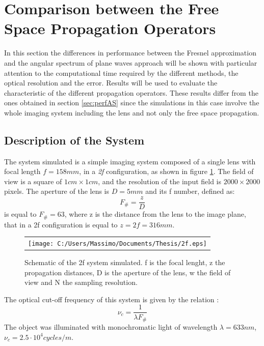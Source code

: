  \section{Comparison between the Free Space Propagation Operators}
 \label{sec:comp}
	 In this section the differences in performance between the Fresnel approximation and the angular spectrum of plane waves approach will be shown with particular attention to the computational time required by the different methods, the optical resolution and the error. Results will be used to evaluate the characteristic of the different propagation operators. These results differ from the ones obtained in section \ref{sec:perfAS} since the simulations in this case involve the whole imaging system including the lens and not only the free space propagation.
	 \subsection{Description of the System}
	 \label{sec:system}
	 The system simulated is a simple imaging system composed of a single lens with focal length $f=158mm$, in a \textit{2f} configuration, as shown in figure \ref{fig:2f}. The field of view is a square of $1cm \times 1cm$, and the resolution of the input field is $2000 \times 2000$ pixels. The aperture of the lens is $D=5mm$ and its f number, defined as:
	 \begin{equation}
	 \label{eq:fnum}
		F_{\#}=\dfrac{z}{D}
	 \end{equation}
	 is equal to $F_{\#}=63$, where z is the distance from the lens to the image plane, that in a 2f configuration is equal to $z=2f=316mm$.
	 \begin{figure}[h]
	 	\begin{center}
	 		\begin{tabular}{c}
	 			\texttt{[image: C:/Users/Massimo/Documents/Thesis/2f.eps]}
	 		\end{tabular}
	 	\end{center}
	 	\caption{ \label{fig:2f} 
	 		Schematic of the 2f system simulated. f is the focal lenght, z the propagation distances, D is the aperture of the lens, w the field of view and N the sampling resolution. }
	 \end{figure} 
	 The optical cut-off frequency of this system is given by the relation \cite{goodman2005introduction}:
	 \begin{equation}
	 \label{eq:cutoff}
	 \nu_c=\dfrac{1}{\lambda F_{\#}}
	 \end{equation} 
	 The object was illuminated with monochromatic light of wavelength $\lambda=633nm$, $\nu_c=2.5\cdot10^4 cycles/m$.
